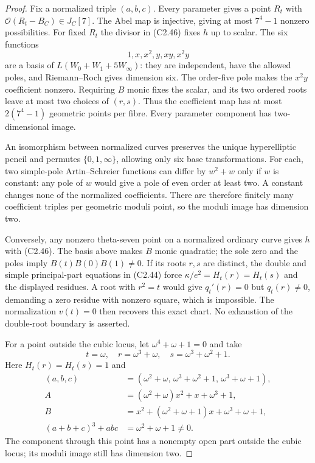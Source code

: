 \begin{proof}
Fix a normalized triple $(a,b,c)$. Every parameter
gives a point $R_t$ with $\mathcal O(R_t-B_C)\in J_C[7]$.
The Abel map is injective, giving at most $7^4-1$
nonzero possibilities. For fixed $R_t$ the divisor
in (C2.46) fixes $h$ up to scalar. The six functions
\[
                         1,x,x^2,y,xy,x^2y
\]
are a basis of $L(W_0+W_1+5W_\infty)$: they are
independent, have the allowed poles, and Riemann--Roch
gives dimension six. The order-five pole makes the
$x^2y$ coefficient nonzero. Requiring $B$ monic
fixes the scalar, and its two ordered roots leave at
most two choices of $(r,s)$. Thus the coefficient
map has at most $2(7^4-1)$ geometric points per fibre.
Every parameter component has two-dimensional image.

An isomorphism between normalized curves preserves
the unique hyperelliptic pencil and permutes
$\{0,1,\infty\}$, allowing only six base transformations.
For each, two simple-pole Artin--Schreier functions
can differ by $w^2+w$ only if $w$ is constant:
any pole of $w$ would give a pole of even order at
least two. A constant changes none of the normalized
coefficients. There are therefore finitely many
coefficient triples per geometric moduli point, so
the moduli image has dimension two.

Conversely, any nonzero theta-seven point on a
normalized ordinary curve gives $h$ with (C2.46).
The basis above makes $B$ monic quadratic; the sole
zero and the poles imply $B(t)B(0)B(1)\ne0$.
If its roots $r,s$ are distinct, the double and simple
principal-part equations in (C2.44) force
$\kappa/e^2=H_t(r)=H_t(s)$ and the displayed residues.
A root with $r^2=t$ would give $q_t'(r)=0$ but
$q_t(r)\ne0$, demanding a zero residue with nonzero
square, which is impossible. The normalization
$v(t)=0$ then recovers this exact chart.
No exhaustion of the double-root boundary is asserted.

For a point outside the cubic locus, let
$\omega^4+\omega+1=0$ and take
\[
             t=\omega,\quad r=\omega^3+\omega,\quad
             s=\omega^3+\omega^2+1 .
\]
Here $H_t(r)=H_t(s)=1$ and
\[
 \begin{aligned}
 (a,b,c)&=(\omega^2+\omega,\,
          \omega^3+\omega^2+1,\,\omega^3+\omega+1),\\
 A&=(\omega^2+\omega)x^2+x+\omega^3+1,\\
 B&=x^2+(\omega^2+\omega+1)x+\omega^3+\omega+1,\\
 (a+b+c)^3+abc&=\omega^2+\omega+1\ne0 .
 \end{aligned}
\]
The component through this point has a nonempty open
part outside the cubic locus; its moduli image still
has dimension two.


\end{proof}
